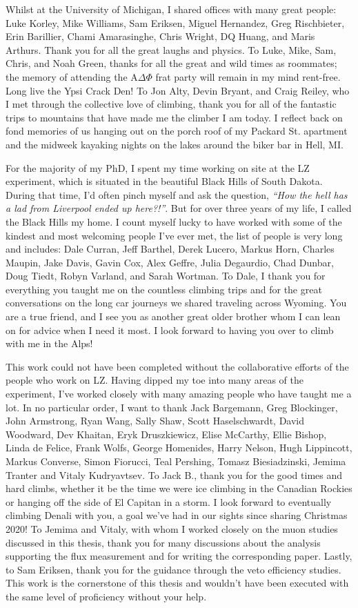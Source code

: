 \documentclass[a4paper,11pt,usegeometry]{scrreprt} %
\begin{document}
Whilst at the University of Michigan, I shared offices with many great people: Luke Korley, Mike Williams, Sam Eriksen, Miguel Hernandez, Greg Rischbieter, Erin Barillier, Chami Amarasinghe, Chris Wright, DQ Huang, and Maris Arthurs. Thank you for all the great laughs and physics. To Luke, Mike, Sam, Chris, and Noah Green, thanks for all the great and wild times as roommates; the memory of attending the A$\Delta\Phi$ frat party will remain in my mind rent-free. Long live the Ypsi Crack Den! To Jon Alty, Devin Bryant, and Craig Reiley, who I met through the collective love of climbing, thank you for all of the fantastic trips to mountains that have made me the climber I am today. I reflect back on fond memories of us hanging out on the porch roof of my Packard St. apartment and the midweek kayaking nights on the lakes around the biker bar in Hell, MI. 

For the majority of my PhD, I spent my time working on site at the LZ experiment, which is situated in the beautiful Black Hills of South Dakota. During that time, I'd often pinch myself and ask the question, \textit{``How the hell has a lad from Liverpool ended up here?!''}. But for over three years of my life, I called the Black Hills my home. I count myself lucky to have worked with some of the kindest and most welcoming people I've ever met, the list of people is very long and includes: Dale Curran, Jeff Barthel, Derek Lucero, Markus Horn, Charles Maupin, Jake Davis, Gavin Cox, Alex Geffre, Julia Degaurdio, Chad Dunbar, Doug Tiedt, Robyn Varland, and Sarah Wortman. To Dale, I thank you for everything you taught me on the countless climbing trips and for the great conversations on the long car journeys we shared traveling across Wyoming. You are a true friend, and I see you as another great older brother whom I can lean on for advice when I need it most. I look forward to having you over to climb with me in the Alps!

This work could not have been completed without the collaborative efforts of the people who work on LZ. Having dipped my toe into many areas of the experiment, I've worked closely with many amazing people who have taught me a lot. In no particular order, I want to thank Jack Bargemann, Greg Blockinger, John Armstrong, Ryan Wang, Sally Shaw, Scott Haselschwardt, David Woodward, Dev Khaitan, Eryk Druszkiewicz, Elise McCarthy, Ellie Bishop, Linda de Felice, Frank Wolfs, George Homenides, Harry Nelson, Hugh Lippincott, Markus Converse, Simon Fiorucci, Teal Pershing, Tomasz Biesiadzinski, Jemima Tranter and Vitaly Kudryavtsev. To Jack B., thank you for the good times and hard climbs, whether it be the time we were ice climbing in the Canadian Rockies or hanging off the side of El Capitan in a storm. I look forward to eventually climbing Denali with you, a goal we've had in our sights since sharing Christmas 2020! To Jemima and Vitaly, with whom I worked closely on the muon studies discussed in this thesis, thank you for many discussions about the analysis supporting the flux measurement and for writing the corresponding paper. Lastly, to Sam Eriksen, thank you for the guidance through the veto efficiency studies. This work is the cornerstone of this thesis and wouldn't have been executed with the same level of proficiency without your help.
\end{document}
